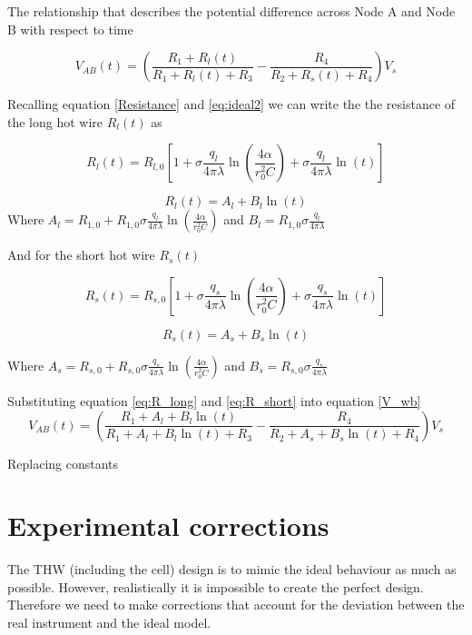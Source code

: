 \documentclass{article}
\begin{document}
\vspace{3mm}

The relationship that describes the potential difference across Node A and Node B with respect to time  

	\begin{equation} \label{V_wb}
V_{AB}(t) = \left( \frac{R_1 + R_l(t)}{R_1 + R_l(t) + R_3} - \frac{R_4}{R_2 + R_s(t) + R_4} \right) V_{s}
	\end{equation}

Recalling equation \ref{Resistance} and \ref{eq:ideal2} we can write the the resistance of the long hot wire $R_l(t)$ as

$$R_l(t) = R_{l,0} \left[ 1 + \sigma \frac{q_l}{4 \pi \lambda} \ln \left( \frac{4 \alpha }		{r^2_0 C}\right) + \sigma \frac{q_l}{4 \pi \lambda} \ln \left( t \right) \right]$$

	\begin{equation} \label{eq:R_long}
	R_l(t) = A_l + B_l \ln (t)
	\end{equation}
Where $A_l = R_{1,0} + R_{1,0} \sigma \frac{q_l}{4 \pi \lambda} \ln \left( \frac{4 \alpha }		{r^2_0 C}\right)$ and $B_l = R_{1,0} \sigma \frac{q_l}{4 \pi \lambda}$


\vspace{3mm}

And for the short hot wire $R_s(t)$

$$R_s(t) = R_{s,0} \left[ 1 + \sigma \frac{q_s}{4 \pi \lambda} \ln \left( \frac{4 \alpha }		{r^2_0 C}\right) + \sigma \frac{q_s}{4 \pi \lambda} \ln \left( t \right) \right]$$
	
	\begin{equation} \label{eq:R_short}
	R_s(t) = A_s + B_s \ln (t)
	\end{equation}

Where $A_s = R_{s,0} + R_{s,0} \sigma \frac{q_s}{4 \pi \lambda} \ln \left( \frac{4 \alpha }		{r^2_0 C}\right)$ and $B_s = R_{s,0} \sigma \frac{q_s}{4 \pi \lambda}$

\vspace{3mm}

Substituting equation \ref{eq:R_long} and \ref{eq:R_short} into equation \ref{V_wb}
$$V_{AB}(t) = \left( \frac{R_1 + A_l + B_l \ln (t)}{R_1 + A_l + B_l \ln (t) + R_3} - \frac{R_4}{R_2 + A_s + B_s \ln (t) + R_4} \right) V_{s}$$

Replacing constants 



\newpage

\section{Experimental corrections }
The THW (including the cell) design is to mimic the ideal behaviour as much as possible. However, realistically it is impossible to create the perfect design. Therefore we need to make corrections that account for the deviation between the real instrument and the ideal model.
\end{document}

